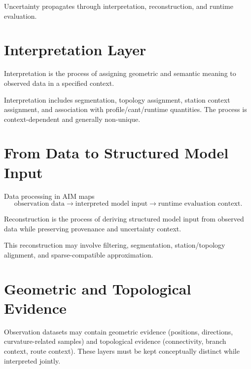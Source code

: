 Uncertainty propagates through interpretation, reconstruction, and
runtime evaluation.

\section{Interpretation Layer}

\begin{definition}[Interpretation]
Interpretation is the process of assigning geometric and semantic
meaning to observed data in a specified context.
\end{definition}

Interpretation includes segmentation, topology assignment, station
context assignment, and association with profile/cant/runtime
quantities. The process is context-dependent and generally non-unique.

\section{From Data to Structured Model Input}

Data processing in AIM maps
\[
\text{observation data}
\rightarrow
\text{interpreted model input}
\rightarrow
\text{runtime evaluation context}.
\]

\begin{definition}
Reconstruction is the process of deriving structured model input from
observed data while preserving provenance and uncertainty context.
\end{definition}

This reconstruction may involve filtering, segmentation,
station/topology alignment, and sparse-compatible approximation.

\section{Geometric and Topological Evidence}

Observation datasets may contain geometric evidence (positions,
directions, curvature-related samples) and topological evidence
(connectivity, branch context, route context). These layers must be
kept conceptually distinct while interpreted jointly.

